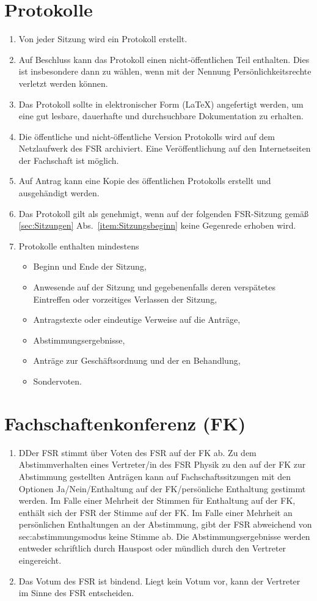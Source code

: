 \section{Protokolle}
\label{sec:protokolle}
\begin{enumerate}
	\item Von jeder Sitzung wird ein Protokoll erstellt.
	\item Auf Beschluss kann das Protokoll einen nicht-öffentlichen Teil enthalten.
	Dies ist insbesondere dann zu wählen, wenn mit der Nennung Persönlichkeitsrechte verletzt werden können.
	\item Das Protokoll sollte in elektronischer Form (\LaTeX) angefertigt werden, um eine gut lesbare, dauerhafte und durchsuchbare Dokumentation zu erhalten.
	\item Die öffentliche und nicht-öffentliche Version Protokolls wird auf dem Netzlaufwerk des FSR archiviert.
	Eine Veröffentlichung auf den Internetseiten der Fachschaft ist möglich.
	\item Auf Antrag kann eine Kopie des öffentlichen Protokolls erstellt und ausgehändigt werden.
	\item Das Protokoll gilt als genehmigt, wenn auf der folgenden FSR-Sitzung gemäß \ref{sec:Sitzungen} Abs.~\ref{item:Sitzungsbeginn} keine Gegenrede erhoben wird.
	\item Protokolle enthalten mindestens
	\begin{itemize}
		\item Beginn und Ende der Sitzung,
		\item Anwesende auf der Sitzung und gegebenenfalls deren verspätetes Eintreffen oder vorzeitiges Verlassen der Sitzung,
		\item Antragstexte oder eindeutige Verweise auf die Anträge,
		\item Abstimmungsergebnisse,
		\item Anträge zur Geschäftsordnung und der en Behandlung,
		\item Sondervoten.
	\end{itemize}
\end{enumerate}

\section{Fachschaftenkonferenz (FK)}
\begin{enumerate}
	\item DDer FSR stimmt über Voten des FSR auf der FK ab. Zu dem Abstimmverhalten
	eines Vertreter/in des FSR Physik zu den auf der FK zur Abstimmung gestellten
	Anträgen kann auf Fachschaftssitzungen mit den Optionen Ja/Nein/Enthaltung auf der
	FK/persönliche Enthaltung gestimmt werden. Im Falle einer Mehrheit der Stimmen für Enthaltung auf der FK, enthält sich der FSR
	der Stimme auf der FK. Im Falle einer Mehrheit an persönlichen Enthaltungen an der
	Abstimmung, gibt der FSR abweichend von sec:abstimmungsmodus keine Stimme ab.
	Die Abstimmungsergebnisse werden entweder schriftlich durch Hauspost oder mündlich durch den Vertreter eingereicht.
	\item Das Votum des FSR ist bindend.
	Liegt kein Votum vor, kann der Vertreter im Sinne des FSR entscheiden.
\end{enumerate}


